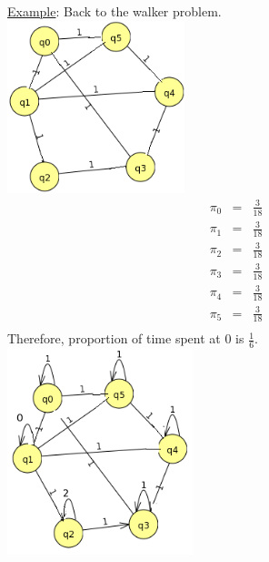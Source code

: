     \noindent \underline{Example}: Back to the walker problem.\\
      \includegraphics[height=50mm]{figure_9.png}\\
      \begin{eqnarray*}
        \pi_0 & = & \frac{3}{18}\\
        \pi_1 & = & \frac{3}{18}\\
        \pi_2 & = & \frac{3}{18}\\
        \pi_3 & = & \frac{3}{18}\\
        \pi_4 & = & \frac{3}{18}\\
        \pi_5 & = & \frac{3}{18}\\
      \end{eqnarray*}
      Therefore, proportion of time spent at 0 is $\frac{1}{6}$.\\
      \includegraphics[height=60mm]{figure_10.png}\\

